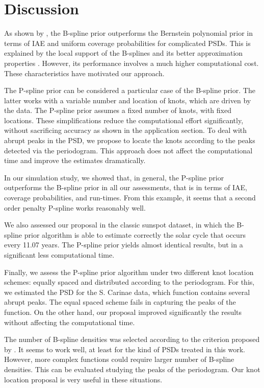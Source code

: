 \documentclass[aps,reprint,amsmath,amssymb,showpacs,showkeys]{revtex4-1}%
\begin{document}
\section{Discussion}

As shown by \cite{Edwards2018}, the B-spline prior outperforms the Bernstein polynomial prior in terms of IAE and uniform coverage probabilities for complicated PSDs.  This is explained by the local support of the B-splines and its better approximation properties \citep{Edwards2018}.  However, its performance involves a much higher computational cost.  These characteristics have motivated our approach.  

The P-spline prior can be considered a particular case of the B-spline prior.  The latter works with a variable number and location of knots, which are driven by the data.  The P-spline prior assumes a fixed number of knots, with fixed locations.  These simplifications reduce the computational effort significantly, without sacrificing accuracy as shown in the application section.  To deal with abrupt peaks in the PSD, we propose to locate the knots according to the peaks detected via the periodogram.  This approach does not affect the computational time and improve the estimates dramatically.

In our simulation study, we showed that, in general, the P-spline prior outperforms the B-spline prior in all our assessments, that is in terms of IAE, coverage probabilities, and run-times.  From this example, it seems that a second order penalty P-spline works reasonably well.

We also assessed our proposal in the classic sunspot dataset, in which the B-spline prior algorithm is able to estimate correctly the solar cycle that occurs every 11.07 years.  The P-spline prior yields almost identical results, but in a significant less computational time.  

Finally, we assess the P-spline prior algorithm under two different knot location schemes: equally spaced and distributed according to the periodogram.  For this, we estimated the PSD for the S. Carinae data, which function contains several abrupt peaks.  The equal spaced scheme fails in capturing the peaks of the function.  On the other hand, our proposal improved significantly the results without affecting the computational time.

The number of B-spline densities was selected according to the criterion proposed by \cite{Ruppert2002}.  It seems to work well, at least for the kind of PSDs treated in this work.  However, more complex functions could require larger number of B-spline densities.  This can be evaluated studying the peaks of the periodogram.  Our knot location proposal is very useful in these situations.
\end{document}

